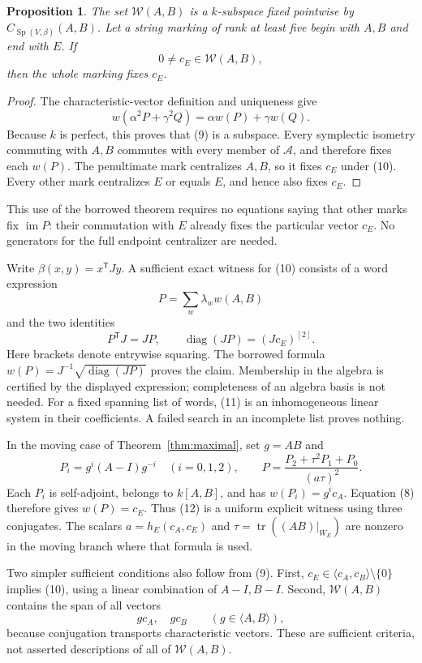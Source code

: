 \documentclass[11pt]{article}
\newtheorem{proposition}[theorem]{Proposition}
\newcommand{\im}{\operatorname{im}}
\newcommand{\Sp}{\operatorname{Sp}}
\begin{document}
\begin{proposition}\label{prop:prefix}
The set \(\mathcal W(A,B)\) is a \(k\)-subspace fixed pointwise
by \(C_{\Sp(V,\beta)}(A,B)\).
Let a string marking of rank at least five begin with \(A,B\)
and end with \(E\). If
\[
                       0\ne c_E\in\mathcal W(A,B),     \tag{10}
\]
then the whole marking fixes \(c_E\).
\end{proposition}
\begin{proof}
The characteristic-vector definition and uniqueness give
\[
 w(\alpha^2P+\gamma^2Q)=\alpha w(P)+\gamma w(Q).
\]
Because \(k\) is perfect, this proves that (9) is a subspace.
Every symplectic isometry commuting with \(A,B\) commutes with
every member of \(\mathcal A\), and therefore fixes each \(w(P)\).
The penultimate mark centralizes \(A,B\), so it fixes \(c_E\)
under (10). Every other mark centralizes \(E\) or equals \(E\),
and hence also fixes \(c_E\).
\end{proof}

This use of the borrowed theorem requires no equations saying that
other marks fix \(\im P\): their commutation with \(E\) already
fixes the particular vector \(c_E\). No generators for the full
endpoint centralizer are needed.

Write \(\beta(x,y)=x^{\mathsf T}Jy\). A sufficient exact witness
for (10) consists of a word expression
\[
                         P=\sum_w\lambda_w w(A,B)
\]
and the two identities
\[
        P^{\mathsf T}J=JP,\qquad
        \operatorname{diag}(JP)=(Jc_E)^{[2]}.           \tag{11}
\]
Here brackets denote entrywise squaring. The borrowed formula
\(w(P)=J^{-1}\sqrt{\operatorname{diag}(JP)}\) proves the claim.
Membership in the algebra is certified by the displayed expression;
completeness of an algebra basis is not needed.
For a fixed spanning list of words, (11) is an inhomogeneous
linear system in their coefficients. A failed search in an
incomplete list proves nothing.

In the moving case of Theorem~\ref{thm:maximal}, set \(g=AB\) and
\[
       P_i=g^i(A-I)g^{-i}\quad(i=0,1,2),\qquad
       P=\frac{P_2+\tau^2P_1+P_0}{(a\tau)^2}.         \tag{12}
\]
Each \(P_i\) is self-adjoint, belongs to \(k[A,B]\), and has
\(w(P_i)=g^ic_A\). Equation (8) therefore gives \(w(P)=c_E\).
Thus (12) is a uniform explicit witness using three conjugates.
The scalars \(a=h_E(c_A,c_E)\) and
\(\tau=\operatorname{tr}((AB)|_{W_E})\) are nonzero in the moving branch
where that formula is used.

Two simpler sufficient conditions also follow from (9).
First, \(c_E\in\langle c_A,c_B\rangle\setminus\{0\}\) implies
(10), using a linear combination of \(A-I,B-I\).
Second, \(\mathcal W(A,B)\) contains the span of all vectors
\[
       g c_A,\quad g c_B\qquad(g\in\langle A,B\rangle),
\]
because conjugation transports characteristic vectors.
These are sufficient criteria, not asserted descriptions of all
of \(\mathcal W(A,B)\).
\end{document}
